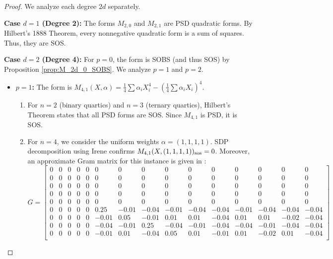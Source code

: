 \documentclass{article}
\begin{document}
\begin{proof}
We analyze each degree $2d$ separately.

\noindent \textbf{Case $d=1$ (Degree 2):}
The forms $M_{2,0}$ and $M_{2,1}$ are PSD quadratic forms. By Hilbert's 1888 Theorem, every nonnegative quadratic 
form is a sum of squares. Thus, they are SOS.

\noindent \textbf{Case $d=2$ (Degree 4):}
For $p=0$, the form is SOBS (and thus SOS) by Proposition \ref{prop:M_2d_0_SOBS}. We analyze $p=1$ and $p=2$.
\begin{itemize}
    \item \textbf{$p=1$:} The form is $M_{4,1}(X, \alpha) = \frac{1}{4}\sum \alpha_i X_i^4 - (\frac{1}{4}\sum \alpha_i X_i)^4$.
    \begin{enumerate}
        \item For $n=2$ (binary quartics) and $n=3$ (ternary quartics), Hilbert's Theorem states that all PSD forms are SOS. 
        Since $M_{4,1}$ is PSD, it is SOS.
        \item For $n=4$, we consider the uniform weights $\alpha = (1,1,1,1)$.
                 SDP decomposition using Irene \cite{GMIr} confirms $M_{4,1}(X, (1,1,1,1))_{\rm sos}=0$.
               Moreover, an approximate Gram matrix for this instance is given in \cite{GMIr}:
         {\scriptsize
         \setlength\arraycolsep{1.5pt}
         \[
            G = \begin{bmatrix}
            0 & 0 & 0 & 0 & 0 & 0 & 0 & 0 & 0 & 0 & 0 & 0 & 0 & 0 & 0 \\
            0 & 0 & 0 & 0 & 0 & 0 & 0 & 0 & 0 & 0 & 0 & 0 & 0 & 0 & 0 \\
            0 & 0 & 0 & 0 & 0 & 0 & 0 & 0 & 0 & 0 & 0 & 0 & 0 & 0 & 0 \\
            0 & 0 & 0 & 0 & 0 & 0 & 0 & 0 & 0 & 0 & 0 & 0 & 0 & 0 & 0 \\
            0 & 0 & 0 & 0 & 0 & 0 & 0 & 0 & 0 & 0 & 0 & 0 & 0 & 0 & 0 \\
            0 & 0 & 0 & 0 & 0 & 0.25 & -0.01 & -0.04 & -0.01 & -0.04 & -0.04 & -0.01 & -0.04 & -0.04 & -0.04 \\
            0 & 0 & 0 & 0 & 0 & -0.01 & 0.05 & -0.01 & 0.01 & 0.01 & -0.04 & 0.01 & 0.01 & -0.02 & -0.04 \\
            0 & 0 & 0 & 0 & 0 & -0.04 & -0.01 & 0.25 & -0.04 & -0.01 & -0.04 & -0.04 & -0.01 & -0.04 & -0.04 \\
            0 & 0 & 0 & 0 & 0 & -0.01 & 0.01 & -0.04 & 0.05 & 0.01 & -0.01 & 0.01 & -0.02 & 0.01 & -0.04 \\

\end{bmatrix}\]}
\end{enumerate}
\end{itemize}
\end{proof}
\end{document}
